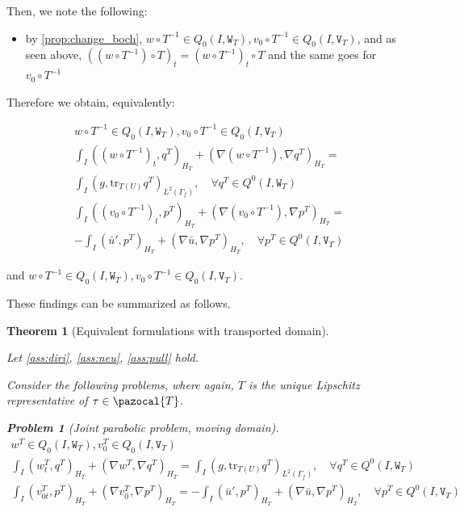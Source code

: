 \documentclass[english,a4paper,9pt,oneside]{scrbook}	%
\theoremstyle{break}
\newtheorem{thm}[equation]{Theorem}
\newtheorem{pb}[equation]{Problem}
\theoremstyle{remark}
\newcommand{\tr}{\text{tr}}
\newcommand{\cT}{\pazocal{T}}
\newcommand{\tw}[1]{\texttt{#1}}
\begin{document}
\begin{appendices}
Then, we note the following:

\begin{itemize}
	\item by \cref{prop:change_boch}, $w\circ T^{-1} \in Q_0(I, \tw{W}_T), v_0\circ T^{-1} \in Q_0(I,\tw{V}_T) $, and as seen above, $((w\circ T^{-1})\circ T)_t = (w\circ T^{-1})_t\circ T$ and the same goes for $v_0\circ T^{-1}$
\end{itemize}

Therefore we obtain, equivalently:

\begin{align*}
w\circ T^{-1} \in Q_0(I, \tw{W}_T), v_0\circ T^{-1} \in Q_0(I,\tw{V}_T) \\
\int_I ((w\circ T^{-1})_t , q^T)_{H_T}+ (\nabla (w\circ T^{-1}), \nabla q^T)_{H_T} = \\\int_I(g,\tr_{T(U)} q^T)_{L^2(\Gamma_f)}, \quad \forall q^T \in Q^0(I, \tw{W}_T) \\
\int_I ((v_0\circ T^{-1})_t,p^T)_{H_T} + (\nabla (v_0\circ T^{-1}), \nabla p^T)_{H_T}= \\-\int_I(\bar{u}',p^T)_{H_T}+(\nabla \bar{u}, \nabla p^T)_{H_T}, \quad \forall p^T \in Q^0(I, \tw{V}_T)
\end{align*}

and $w\circ T^{-1} \in Q_0(I, \tw{W}_T), v_0\circ T^{-1} \in Q_0(I,\tw{V}_T)$.

These findings can be summarized as follows.

\begin{thm}[Equivalent formulations with transported domain]
\label{thm:eq_pde}

Let \cref{ass:diri}, \cref{ass:neu}, \cref{ass:pull} hold.

Consider the following problems, where again, $T$ is the unique Lipschitz representative of $\tau \in \cT$.

\begin{pb}[Joint parabolic problem, moving domain]
\label{pb:joint_mov}
\begin{align*}
w^T \in Q_0(I, \tw{W}_T), v_0^T \in Q_0(I,\tw{V}_T) \\
\int_I  (w^T_t , q^T)_{H_T}+ (\nabla w^T, \nabla q^T)_{H_T} = \int_I(g,\tr_{T(U)} q^T)_{L^2(\Gamma_f)}, \quad \forall q^T \in Q^0(I, \tw{W}_T) \\
\int_I (v^T_{0t},p^T)_{H_T} + (\nabla v_0^T, \nabla p^T)_{H_T}= -\int_I(\bar{u}',p^T)_{H_T}+(\nabla \bar{u}, \nabla p^T)_{H_T}, \quad \forall p^T \in Q^0(I, \tw{V}_T)
\end{align*}
\end{pb}


\end{thm}
\end{appendices}
\end{document}
